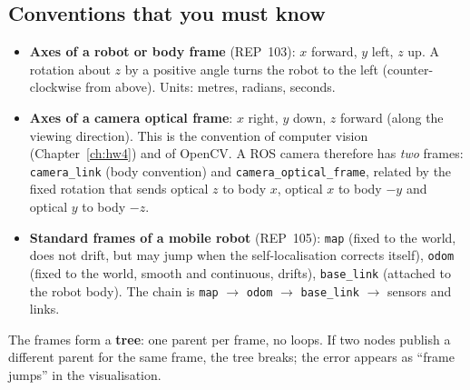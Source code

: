 \subsection*{Conventions that you must know}
\begin{itemize}[nosep]
\item \textbf{Axes of a robot or body frame} (REP~103): $x$ forward, $y$ left, $z$ up. A rotation about $z$ by a positive angle turns the robot to the left (counter-clockwise from above). Units: metres, radians, seconds.
\item \textbf{Axes of a camera optical frame}: $x$ right, $y$ down, $z$ forward (along the viewing direction). This is the convention of computer vision (Chapter~\ref{ch:hw4}) and of OpenCV. A ROS camera therefore has \emph{two} frames: \verb!camera_link! (body convention) and \verb!camera_optical_frame!, related by the fixed rotation that sends optical $z$ to body $x$, optical $x$ to body $-y$ and optical $y$ to body $-z$.
\item \textbf{Standard frames of a mobile robot} (REP~105): \verb!map! (fixed to the world, does not drift, but may jump when the self-localisation corrects itself), \verb!odom! (fixed to the world, smooth and continuous, drifts), \verb!base_link! (attached to the robot body). The chain is \verb!map! $\to$ \verb!odom! $\to$ \verb!base_link! $\to$ sensors and links.
\end{itemize}
\begin{center}
\label{fig:ros4_tree}
\end{center}
The frames form a \textbf{tree}: one parent per frame, no loops. If two nodes publish a different parent for the same frame, the tree breaks; the error appears as ``frame jumps'' in the visualisation.

